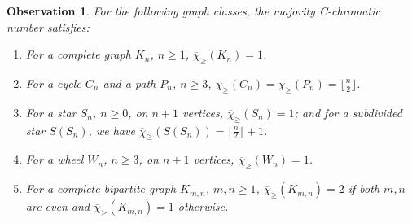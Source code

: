 \documentclass{article}
\newtheorem{observation}[theorem]{Observation}
\theoremstyle{definition}
\newcommand{\mc}{\overline{\chi}_{\geqslant}}
\begin{document}
\begin{observation} \label{obs:simple_graph_classes}
For the following graph classes, the majority C-chromatic number satisfies:
\begin{enumerate}[label=\normalfont(\roman*)]
\item For a complete graph $K_n$, $n\geq 1$, $\mc(K_n)=1$.
    
    \item For a cycle $C_n$ and a path $P_n$, $n\geq 3$, $\mc(C_n)=\mc(P_n)=\lfloor \frac{n}{2}\rfloor$.
\item For a star $S_n$, $n\geq 0$, on $n+1$ vertices, $\mc(S_n)=1$; and for a subdivided star $S(S_n)$, we have $\mc(S(S_n))=\lfloor \frac{n}{2}\rfloor + 1$.
    \item For a wheel $W_n$, $n\geq 3$, on $n+1$ vertices, $\mc(W_n)=1$.
    \item For a complete bipartite graph $K_{m,n}$, $m,n\geq 1$, $\mc(K_{m,n})=2$ if both $m,n$ are even and $\mc(K_{m,n})=1$ otherwise.
\end{enumerate}
\end{observation}
\end{document}
